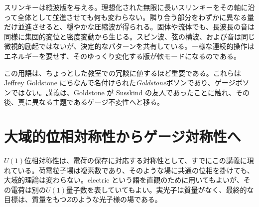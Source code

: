 \begin{classroomqa}
\end{classroomqa}

スリンキーは縦波版を与える。理想化された無限に長いスリンキーをその軸に沿って全体として並進させても何も変わらない。隣り合う部分をわずかに異なる量だけ並進させると、穏やかな圧縮波が得られる。固体や流体でも、長波長の音は同様に集団的変位と密度変動から生じる。スピン波、弦の横波、および音は同じ微視的励起ではないが、決定的なパターンを共有している。一様な連続的操作はエネルギーを要せず、そのゆっくり変化する版が軟モードになるのである。

この用語は、ちょっとした教室での冗談に値するほど重要である。これらは Jeffrey Goldstone にちなんで名付けられた\emph{Goldstone}ボソンであり、ゲージボソンではない。講義は、Goldstone が Susskind の友人であったことに触れ、その後、真に異なる主題であるゲージ不変性へと移る。

\section{大域的位相対称性からゲージ対称性へ}

\(U(1)\)位相対称性は、電荷の保存に対応する対称性として、すでにこの講義に現れている。荷電粒子場は複素数であり、そのような場に共通の位相を掛けても、大域的理論は変わらない。electric という語を直観のために用いてもよいが、その電荷は別の\(U(1)\)量子数を表していてもよい。実光子は質量がなく、最終的な目標は、質量をもつ\(Z\)のような光子様の場である。

